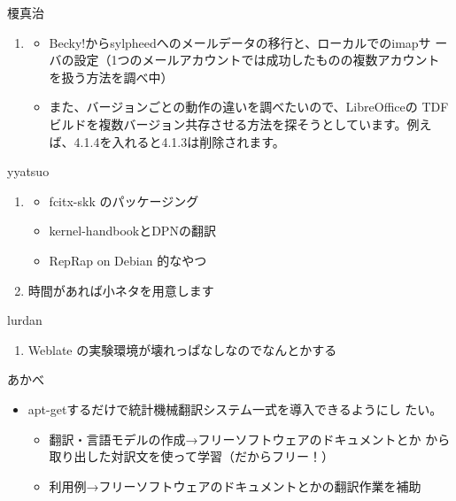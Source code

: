 \documentclass[mingoth,a4paper]{jsarticle}
\begin{document}
\begin{prework}{ 榎真治 }
  \begin{enumerate}
  \item
    \begin{itemize}
    \item Becky!からsylpheedへのメールデータの移行と、ローカルでのimapサ
      ーバの設定（1つのメールアカウントでは成功したものの複数アカウント
        を扱う方法を調べ中）
    \item また、バージョンごとの動作の違いを調べたいので、LibreOfficeの
      TDFビルドを複数バージョン共存させる方法を探そうとしています。例え
      ば、4.1.4を入れると4.1.3は削除されます。
    \end{itemize}
  \end{enumerate}
\end{prework}

\begin{prework}{ yyatsuo }
  \begin{enumerate}
  \item 
    \begin{itemize}
    \item fcitx-skk のパッケージング
    \item kernel-handbookとDPNの翻訳
    \item RepRap on Debian 的なやつ
    \end{itemize}
  \item 時間があれば小ネタを用意します
  \end{enumerate}
\end{prework}

\begin{prework}{ lurdan }
  \begin{enumerate}
  \item Weblate の実験環境が壊れっぱなしなのでなんとかする
  \end{enumerate}
\end{prework}

\begin{prework}{ あかべ }
  \begin{itemize}
  \item apt-getするだけで統計機械翻訳システム一式を導入できるようにし
    たい。
    \begin{itemize}
    \item 翻訳・言語モデルの作成→フリーソフトウェアのドキュメントとか
      から取り出した対訳文を使って学習（だからフリー！）
    \item 利用例→フリーソフトウェアのドキュメントとかの翻訳作業を補助
    \end{itemize}
  \end{itemize}
\end{prework}
\end{document}
